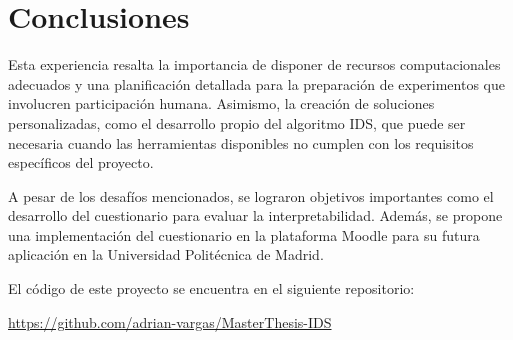 \section{Conclusiones}
Esta experiencia resalta la importancia de disponer de recursos computacionales adecuados y una planificación detallada para la preparación de experimentos que involucren participación humana. Asimismo, la creación de soluciones personalizadas, como el desarrollo propio del algoritmo IDS, que puede ser necesaria cuando las herramientas disponibles no cumplen con los requisitos específicos del proyecto.

A pesar de los desafíos mencionados, se lograron objetivos importantes como el desarrollo del cuestionario para evaluar la interpretabilidad. Además, se propone una implementación del cuestionario en la plataforma Moodle para su futura aplicación en la Universidad Politécnica de Madrid. 

El código de este proyecto se encuentra en el siguiente repositorio: 

\href{https://github.com/adrian-vargas/MasterThesis-IDS}{https://github.com/adrian-vargas/MasterThesis-IDS}